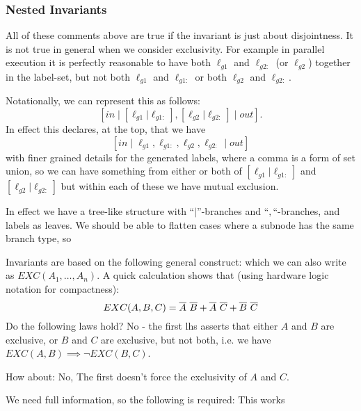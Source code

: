 \subsubsection{Nested Invariants}


All of these comments above are true if the invariant is just about disjointness.
It is not true in general when we consider exclusivity.
For example in parallel execution it is perfectly reasonable to have both
$\ell_{g1}$ and $\ell_{g2:}$ (or $\ell_{g2}$) together in the label-set,
but not both $\ell_{g1}$ and $\ell_{g1:}$
or both $\ell_{g2}$ and $\ell_{g2:}$.

Notationally, we can represent this as follows:
$$
[in \mid [\ell_{g1}|\ell_{g1:}],[\ell_{g2}|\ell_{g2:}] \mid out].
$$
In effect this declares, at the top, that we have
$$
[in \mid \ell_{g1},\ell_{g1:},\ell_{g2},\ell_{g2:} \mid out]
$$
with finer grained details for the generated labels,
where a comma is a form of set union,
so we can have something from
either or both of $[\ell_{g1}|\ell_{g1:}]$ and $[\ell_{g2}|\ell_{g2:}]$
but within each of these we have mutual exclusion.

In effect we have a tree-like structure with ``$|$''-branches
and ``$,$``-branches, and labels as leaves.
We should be able to flatten cases where a subnode has the same branch type,
so



Invariants are based on the following general construct:
which we can also write as $EXC(A_1,\dots,A_n)$.
A quick calculation shows that
(using hardware logic notation for compactness):
\[
 EXC(A,B,C) = \overline{A} ~ \overline{B}  + \overline{A} ~ \overline{C} + \overline{B} ~ \overline{C}
\]
Do the following laws hold?
No - the first lhs asserts that either $A$ and $B$ are exclusive,
or $B$ and $C$ are exclusive, but not both,
i.e. we have $EXC(A,B) \implies \lnot EXC(B,C)$.

How about:
No, The first doesn't force the exclusivity of $A$ and $C$.

We need full information, so the following is required:
This works

